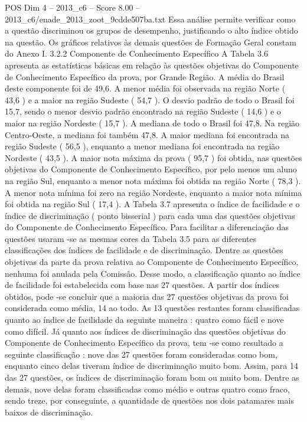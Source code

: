\begin{textsample}{POS Dim 4 – 2013\_c6 – Score 8.00 – 2013\_c6/enade\_2013\_zoot\_9cdde507ba.txt}
Essa análise permite verificar como a questão discriminou os grupos de desempenho, justificando o alto índice obtido na questão.
Os gráficos relativos às demais questões de Formação Geral constam do Anexo I. 3.2.2 Componente de Conhecimento Específico A Tabela 3.6 apresenta as estatísticas básicas em relação às questões objetivas do Componente de Conhecimento Específico da prova, por Grande Região.
A média do Brasil deste componente foi de 49,6.
A menor média foi observada na região Norte ( 43,6 ) e a maior na região Sudeste ( 54,7 ).
O desvio padrão de todo o Brasil foi 15,7, sendo o menor desvio padrão encontrado na região Sudeste ( 14,6 ) e o maior na região Nordeste ( 15,7 ).
A mediana de todo o Brasil foi 47,8.
Na região Centro-Oeste, a mediana foi também 47,8.
A maior mediana foi encontrada na região Sudeste ( 56,5 ), enquanto a menor mediana foi encontrada na região Nordeste ( 43,5 ).
A maior nota máxima da prova ( 95,7 ) foi obtida, nas questões objetivas do Componente de Conhecimento Específico, por pelo menos um aluno na região Sul, enquanto a menor nota máxima foi obtida na região Norte ( 78,3 ).
A menor nota mínima foi zero na região Nordeste, enquanto a maior nota mínima foi obtida na região Sul ( 17,4 ).
A Tabela 3.7 apresenta o índice de facilidade e o índice de discriminação ( ponto bisserial ) para cada uma das questões objetivas do Componente de Conhecimento Específico.
Para facilitar a diferenciação das questões usaram -se as mesmas cores da Tabela 3.5 para as diferentes classificações dos índices de facilidade e de discriminação.
Dentre as questões objetivas da parte da prova relativa ao Componente de Conhecimento Específico, nenhuma foi anulada pela Comissão.
Desse modo, a classificação quanto ao índice de facilidade foi estabelecida com base nas 27 questões.
A partir dos índices obtidos, pode -se concluir que a maioria das 27 questões objetivas da prova foi considerada como média, 14 ao todo.
As 13 questões restantes foram classificadas quanto ao índice de facilidade da seguinte maneira : quatro como fácil e nove como difícil.
Já quanto aos índices de discriminação das questões objetivas do Componente de Conhecimento Específico da prova, tem -se como resultado a seguinte classificação : nove das 27 questões foram consideradas como bom, enquanto cinco delas tiveram índice de discriminação muito bom.
Assim, para 14 das 27 questões, os índices de discriminação foram bom ou muito bom.
Dentre as demais, nove delas foram classificadas como médio e outras quatro como fraco, sendo treze, por conseguinte, a quantidade de questões nos dois patamares mais baixos de discriminação.

\end{textsample}
